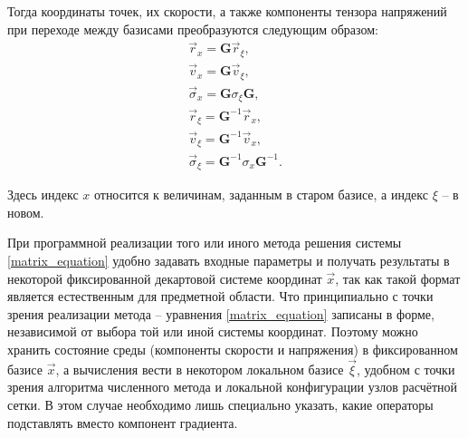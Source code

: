 Тогда координаты точек, их скорости, а также компоненты тензора напряжений при переходе между базисами преобразуются следующим образом:
\begin{eqnarray}
\label{basis_change}
\vec r_x = \mathbf G \vec r_{\xi},
\nonumber\\
\vec v_x = \mathbf G \vec v_{\xi},
\nonumber\\
\vec \sigma_x = \mathbf G \sigma_{\xi} \mathbf G,
\nonumber\\
\vec r_{\xi} = {\mathbf G}^{-1} \vec r_x,
\nonumber\\
\vec v_{\xi} = {\mathbf G}^{-1} \vec v_x,
\nonumber\\
\vec \sigma_{\xi} = {\mathbf G}^{-1} \sigma_x {\mathbf G}^{-1}.
\end{eqnarray}

Здесь индекс $x$ относится к величинам, заданным в старом базисе, а индекс $\xi$ -- в новом.

При программной реализации того или иного метода решения системы \ref{matrix_equation} удобно задавать входные параметры и получать результаты в некоторой фиксированной декартовой системе координат $\vec x$, так как такой формат является естественным для предметной области. Что принципиально с точки зрения реализации метода -- уравнения \ref{matrix_equation} записаны в форме, независимой от выбора той или иной системы координат. Поэтому можно хранить состояние среды (компоненты скорости и напряжения) в фиксированном базисе $\vec x$, а вычисления вести в некотором локальном базисе $\vec \xi$, удобном с точки зрения алгоритма численного метода и локальной конфигурации узлов расчётной сетки. В этом случае необходимо лишь специально указать, какие операторы подставлять вместо компонент градиента.

